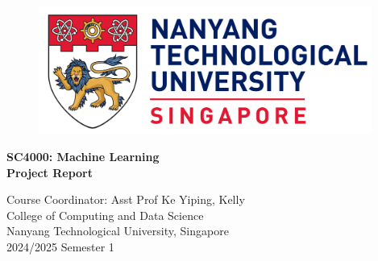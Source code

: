 \begin{titlepage}
	\begin{figure}[!t]
		\centering
		\includegraphics[width = 4.3in]{title/logo.pdf}
	\end{figure}
	
	\centering
	\huge{\textbf{SC4000: Machine Learning}}\\[0.2in]
	\huge{\textbf{Project Report}}\\[2in]
	
	
	\begin{table}[h]
		\centering
	\end{table}
	
	\Large{Course Coordinator: Asst Prof Ke Yiping, Kelly}\\[0.5in]
	
	
	\LARGE{College of Computing and Data Science}\\
	\LARGE{Nanyang Technological University, Singapore}\\[0.3in]
	
	
	\LARGE{2024/2025 Semester 1}
	\newpage
\end{titlepage}
